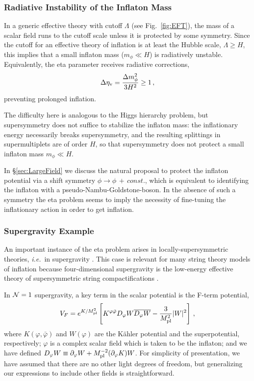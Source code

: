 \documentclass[12pt,letterpaper,rotate]{article}
\def\beq{\begin{equation}}
\def\eeq{\end{equation}}
\begin{document}
{\subsubsection{Radiative Instability of the Inflaton Mass}
\label{sec:higgs}

In a generic effective theory with cutoff $\Lambda$ (see Fig.~\ref{fig:EFT}), the mass of a scalar field runs to the cutoff scale unless it is protected by some symmetry.
Since the cutoff for an effective theory of inflation is at least the Hubble scale, $\Lambda \ge H$,
this implies that a small inflaton mass ($m_\phi \ll H$) is radiatively unstable.
Equivalently, the eta parameter receives radiative corrections,
\beq
\Delta\eta_{\rm v} = \frac{\Delta m_\phi^2}{3 H^2} \ge 1\, ,
\eeq
preventing prolonged inflation.

The difficulty here is analogous to the Higgs hierarchy problem, but supersymmetry does not suffice to stabilize the inflaton mass: the inflationary energy necessarily breaks supersymmetry, and the resulting splittings in supermultiplets are of order $H$, so that supersymmetry does not protect
a small inflaton mass $m_\phi \ll H$.

In \S\ref{sec:LargeField} we discuss the natural proposal to protect the inflaton potential via a shift symmetry $\phi\to\phi \, +\, const.$, which is equivalent to identifying the inflaton with
a pseudo-Nambu-Goldstone-boson.
In the absence of such a symmetry the eta problem seems to imply the necessity of fine-tuning the inflationary action in order to get inflation.



\subsubsection{Supergravity Example}
\label{sec:sugraETA}

An important instance of the eta problem arises in locally-supersymmetric theories, {\it i.e.}~in supergravity \cite{Copeland:1994vg}.
This case is relevant for many string theory models of inflation because four-dimensional supergravity is the low-energy effective theory of supersymmetric string compactifications \cite{PolchinskiOne, Polchinski}.

In ${\cal N} = 1$ supergravity, a key term in the scalar potential is the F-term potential,
\beq
\label{equ:Fterm}
 V_F = e^{K/M_{\rm pl}^2} \left[ K^{\varphi \bar \varphi} D_{\varphi} W \overline{D_{\varphi} W} - \frac{3}{M_{\rm pl}^2} |W|^2 \right]\, ,
\eeq
where $K(\varphi, \bar \varphi)$ and $W(\varphi)$ are the K\"ahler potential and the superpotential, respectively; $\varphi$ is a complex scalar field which is taken to be the inflaton; and
we have defined $D_{\varphi}W \equiv \partial_{\varphi} W + M_{\rm pl}^{-2}(\partial_{\varphi} K) W$.  For simplicity of presentation, we have assumed that there are no other light degrees of freedom, but generalizing our expressions to include other fields is straightforward.

}
\end{document}
